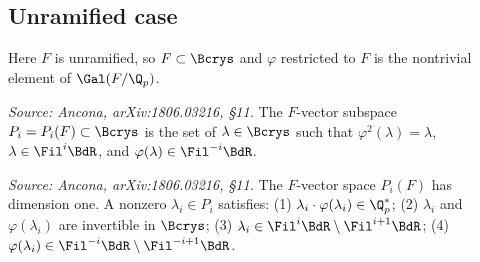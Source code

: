 \subsection*{Unramified case}

Here \(F\) is unramified, so \(F \subset \Bcrys\) and \(\varphi\) restricted to
\(F\) is the nontrivial element of \(\Gal(F/\Q_p)\).

\begin{definition}
  \label{def:periods-unram}
  \textit{Source: Ancona, arXiv:1806.03216, \S11.}
  The \(F\)-vector subspace \(P_i = P_i(F) \subset \Bcrys\) is the set of
  \(\lambda \in \Bcrys\) such that \(\varphi^2(\lambda) = \lambda\),
  \(\lambda \in \Fil^i \BdR\), and \(\varphi(\lambda) \in \Fil^{-i} \BdR\).
\end{definition}

\begin{proposition}
  \label{prop:periods-unram-dim}
  \textit{Source: Ancona, arXiv:1806.03216, \S11.}
  The \(F\)-vector space \(P_i(F)\) has dimension one. A nonzero
  \(\lambda_i \in P_i\) satisfies:
  (1) \(\lambda_i \cdot \varphi(\lambda_i) \in \Q_p^*\);
  (2) \(\lambda_i\) and \(\varphi(\lambda_i)\) are invertible in \(\Bcrys\);
  (3) \(\lambda_i \in \Fil^i \BdR \setminus \Fil^{i+1} \BdR\);
  (4) \(\varphi(\lambda_i) \in \Fil^{-i} \BdR \setminus \Fil^{-i+1} \BdR\).
\end{proposition}

